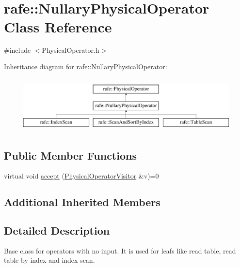 \hypertarget{classrafe_1_1_nullary_physical_operator}{\section{rafe\+:\+:Nullary\+Physical\+Operator Class Reference}
\label{classrafe_1_1_nullary_physical_operator}
}


{\ttfamily \#include $<$Physical\+Operator.\+h$>$}

Inheritance diagram for rafe\+:\+:Nullary\+Physical\+Operator\+:\begin{figure}[H]
\begin{center}
\leavevmode
\includegraphics[height=2.962963cm]{classrafe_1_1_nullary_physical_operator}
\end{center}
\end{figure}
\subsection*{Public Member Functions}
\begin{DoxyCompactItemize}
\item 
virtual void \hyperlink{classrafe_1_1_nullary_physical_operator_a0810fc4b368521ebe847fa48fcdcf948}{accept} (\hyperlink{classrafe_1_1_physical_operator_visitor}{Physical\+Operator\+Visitor} \&v)=0
\end{DoxyCompactItemize}
\subsection*{Additional Inherited Members}


\subsection{Detailed Description}
Base class for operators with no input. It is used for leafs like read table, read table by index and index scan. 

